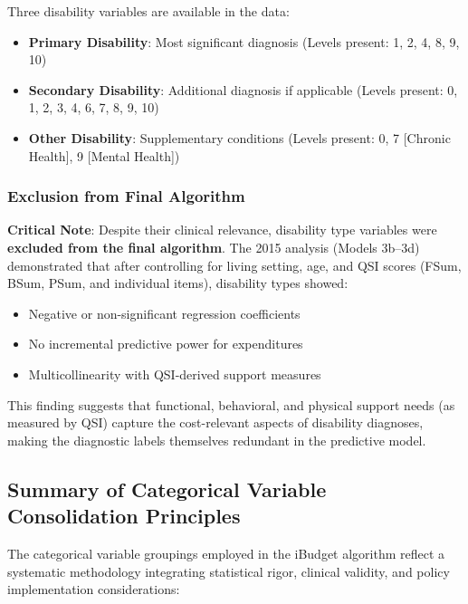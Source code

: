 Three disability variables are available in the data:

\begin{itemize}
    \item \textbf{Primary Disability}: Most significant diagnosis (Levels present: 1, 2, 4, 8, 9, 10)
    \item \textbf{Secondary Disability}: Additional diagnosis if applicable (Levels present: 0, 1, 2, 3, 4, 6, 7, 8, 9, 10)
    \item \textbf{Other Disability}: Supplementary conditions (Levels present: 0, 7 [Chronic Health], 9 [Mental Health])
\end{itemize}

\subsubsection{Exclusion from Final Algorithm}

\textbf{Critical Note}: Despite their clinical relevance, disability type variables were \textbf{excluded from the final algorithm}. The 2015 analysis (Models 3b--3d) demonstrated that after controlling for living setting, age, and QSI scores (FSum, BSum, PSum, and individual items), disability types showed:

\begin{itemize}
    \item Negative or non-significant regression coefficients
    \item No incremental predictive power for expenditures
    \item Multicollinearity with QSI-derived support measures
\end{itemize}

This finding suggests that functional, behavioral, and physical support needs (as measured by QSI) capture the cost-relevant aspects of disability diagnoses, making the diagnostic labels themselves redundant in the predictive model.

\subsection{Summary of Categorical Variable Consolidation Principles}
\label{subsec:consolidation-principles}

The categorical variable groupings employed in the iBudget algorithm reflect a systematic methodology integrating statistical rigor, clinical validity, and policy implementation considerations:

